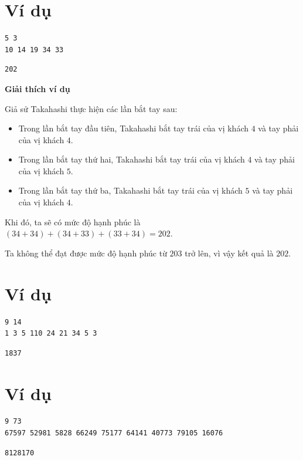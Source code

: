 \documentclass[12pt,a4paper]{article}
\newcommand{\explanation}{%
  \vspace{6pt}\textbf{\textcolor{sectioncolor}{Giải thích ví dụ}}\par\vspace{2pt}%
}
\begin{document}
\section*{Ví dụ}
\begin{inputbox}
\begin{lstlisting}
5 3
10 14 19 34 33
\end{lstlisting}
\end{inputbox}
\begin{outputbox}
\begin{lstlisting}
202
\end{lstlisting}
\end{outputbox}

\explanation
Giả sử Takahashi thực hiện các lần bắt tay sau:
\begin{itemize}
    \item Trong lần bắt tay đầu tiên, Takahashi bắt tay trái của vị khách $4$ và tay phải của vị khách $4$.
    \item Trong lần bắt tay thứ hai, Takahashi bắt tay trái của vị khách $4$ và tay phải của vị khách $5$.
    \item Trong lần bắt tay thứ ba, Takahashi bắt tay trái của vị khách $5$ và tay phải của vị khách $4$.
\end{itemize}

Khi đó, ta sẽ có mức độ hạnh phúc là $(34+34)+(34+33)+(33+34)=202$.

Ta không thể đạt được mức độ hạnh phúc từ $203$ trở lên, vì vậy kết quả là $202$.

\section*{Ví dụ}
\begin{inputbox}
\begin{lstlisting}
9 14
1 3 5 110 24 21 34 5 3
\end{lstlisting}
\end{inputbox}
\begin{outputbox}
\begin{lstlisting}
1837
\end{lstlisting}
\end{outputbox}

\section*{Ví dụ}
\begin{inputbox}
\begin{lstlisting}
9 73
67597 52981 5828 66249 75177 64141 40773 79105 16076
\end{lstlisting}
\end{inputbox}
\begin{outputbox}
\begin{lstlisting}
8128170
\end{lstlisting}
\end{outputbox}
\end{document}

